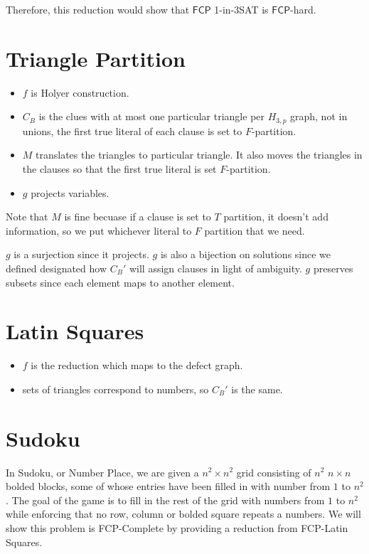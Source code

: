 \documentclass[runningheads,a4paper]{llncs}
\begin{document}
Therefore, this reduction would show that $\mathsf{FCP}$ 1-in-3SAT is $\mathsf{FCP}$-hard. 

\section{Triangle Partition}

\begin{itemize}
\item $f$ is Holyer construction.
\item $C_B$ is the clues with at most one particular triangle per $H_{3,p}$ graph, not in unions, the first true literal of each clause is set to $F$-partition. 
\item $M$ translates the triangles to particular triangle. It also moves the triangles in the clauses so that the first true literal is set $F$-partition.
\item $g$ projects variables. 
\end{itemize}

Note that $M$ is fine becuase if a clause is set to $T$ partition, it doesn't add information, so we put whichever literal to $F$ partition that we need. 

$g$ is a surjection since it projects. $g$ is also a bijection on solutions since we defined designated how $C_B'$ will assign clauses in light of ambiguity. $g$ preserves subsets since each element maps to another element. 

\section{Latin Squares}

\begin{itemize}
\item $f$ is the reduction which maps to the defect graph.
\item sets of triangles correspond to numbers, so $C_B'$ is the same. 
\end{itemize}

\section{Sudoku}

In Sudoku, or Number Place, we are given a $n^2 \times n^2$ grid consisting of $n^2$ $n \times n$ bolded blocks, some of whose entries have been filled in with number from $1$ to $n^2$. The goal of the game is to fill in the rest of the grid with numbers from $1$ to $n^2$ while enforcing that no row, column or bolded square repeats a numbers. We will show this problem is FCP-Complete by providing a reduction from FCP-Latin Squares. 
\end{document}
